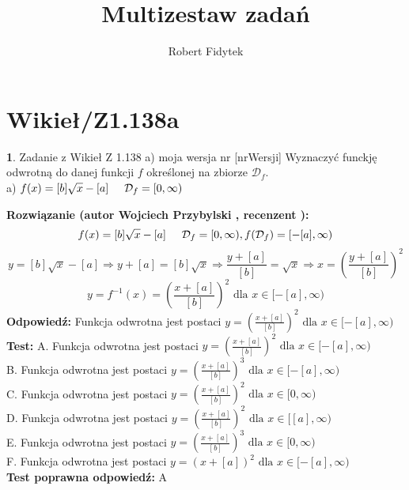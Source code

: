 \documentclass[12pt, a4paper]{article}
\title{Multizestaw zadań}
\author{Robert Fidytek}
\date{}
\theoremstyle{definition} %
\newtheorem{zad}{}
\newcommand{\kategoria}[1]{\section{#1}} %
\newcommand{\zadStart}[1]{\begin{zad}#1\newline} %
\newcommand{\zadStop}{\end{zad}}   %
\newcommand{\rozwStart}[2]{\noindent \textbf{Rozwiązanie (autor #1 , recenzent #2): }\newline} %
\newcommand{\rozwStop}{\newline}                                            %
\newcommand{\odpStart}{\noindent \textbf{Odpowiedź:}\newline}    %
\newcommand{\odpStop}{\newline}                                             %
\newcommand{\testStart}{\noindent \textbf{Test:}\newline} %
\newcommand{\testStop}{\newline} %
\newcommand{\kluczStart}{\noindent \textbf{Test poprawna odpowiedź:}\newline} %
\newcommand{\kluczStop}{\newline} %
\begin{document}
\maketitle


\kategoria{Wikieł/Z1.138a}
\zadStart{Zadanie z Wikieł Z 1.138 a) moja wersja nr [nrWersji]}
Wyznaczyć funckję odwrotną do danej funkcji $f$ określonej na zbiorze $\mathcal{D}_{f}$.\\
a) $f(x)=[b]\sqrt{x}-[a]\hspace{5mm}\mathcal{D}_{f}=[0,\infty)$
\zadStop
\rozwStart{Wojciech Przybylski}{}
$$f(x)=[b]\sqrt{x}-[a]\hspace{5mm} \mathcal{D}_{f}=[0,\infty), f(\mathcal{D}_{f})=[-[a],\infty)$$
$$y=[b]\sqrt{x}-[a] \Rightarrow y+[a]=[b]\sqrt{x} \Rightarrow \frac{y+[a]}{[b]}=\sqrt{x} \Rightarrow x=(\frac{y+[a]}{[b]})^{2}$$
$$y=f^{-1}(x)=(\frac{x+[a]}{[b]})^{2} \mbox{ dla }x\in[-[a],\infty) $$
\rozwStop
\odpStart
Funkcja odwrotna jest postaci $y=(\frac{x+[a]}{[b]})^{2} \mbox{ dla }x\in[-[a],\infty)$
\odpStop
\testStart
A. Funkcja odwrotna jest postaci $y=(\frac{x+[a]}{[b]})^{2} \mbox{ dla }x\in[-[a],\infty)$\\
B. Funkcja odwrotna jest postaci $y=(\frac{x+[a]}{[b]})^{3} \mbox{ dla }x\in[-[a],\infty)$\\
C. Funkcja odwrotna jest postaci $y=(\frac{x+[a]}{[b]})^{2} \mbox{ dla }x\in[0,\infty)$\\
D. Funkcja odwrotna jest postaci $y=(\frac{x+[a]}{[b]})^{2} \mbox{ dla }x\in[[a],\infty)$\\
E. Funkcja odwrotna jest postaci $y=(\frac{x+[a]}{[b]})^{3} \mbox{ dla }x\in[0,\infty)$\\
F. Funkcja odwrotna jest postaci $y=(x+[a])^{2} \mbox{ dla }x\in[-[a],\infty)$\\
\testStop
\kluczStart
A
\kluczStop
\end{document}
